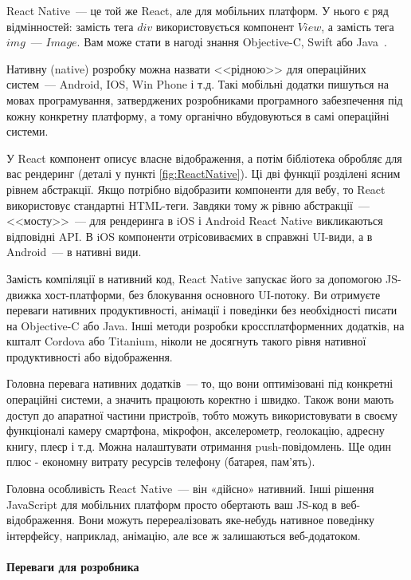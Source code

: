 React Native~--- це той же React, але для мобільних платформ. У нього є ряд відмінностей: замість тега $div$ використовується компонент $View$, а замість тега $img$~--- $Image$. Вам може стати в нагоді знання Objective-C, Swift або Java~\cite{9781787282537}. 

Нативну (native) розробку можна назвати <<рідною>> для операційних систем~--- Android, IOS, Win Phone і т.д. Такі мобільні додатки пишуться на мовах програмування, затверджених розробниками програмного забезпечення під кожну конкретну платформу, а тому органічно вбудовуються в самі операційні системи.

У React компонент описує власне відображення, а потім бібліотека обробляє для вас рендеринг (деталі у пункті \ref{fig:ReactNative}). Ці дві функції розділені ясним рівнем абстракції. Якщо потрібно відобразити компоненти для вебу, то React використовує стандартні HTML-теги. Завдяки тому ж рівню абстракції~--- <<мосту>>~--- для рендеринга в iOS і Android React Native викликаються відповідні API. В iOS компоненти отрісовиваємих в справжні UI-види, а в Android~--- в нативні види.

Замість компіляції в нативний код, React Native запускає його за допомогою JS-движка хост-платформи, без блокування основного UI-потоку. Ви отримуєте переваги нативних продуктивності, анімації і поведінки без необхідності писати на Objective-C або Java. Інші методи розробки кроссплатформенних додатків, на кшталт Cordova або Titanium, ніколи не досягнуть такого рівня нативної продуктивності або відображення.

Головна перевага нативних додатків~--- то, що вони оптимізовані під конкретні операційні системи, а значить працюють коректно і швидко. Також вони мають доступ до апаратної частини пристроїв, тобто можуть використовувати в своєму функціоналі камеру смартфона, мікрофон, акселерометр, геолокацію, адресну книгу, плеєр і т.д. Можна налаштувати отримання push-повідомлень. Ще один плюс - економну витрату ресурсів телефону (батарея, пам'ять).

Головна особливість React Native~--- він «дійсно» нативний. Інші рішення JavaScript для мобільних платформ просто обертають ваш JS-код в веб-відображення. Вони можуть перереалізовать яке-небудь нативное поведінку інтерфейсу, наприклад, анімацію, але все ж  залишаються веб-додатоком.

\paragraph{Переваги для розробника}


